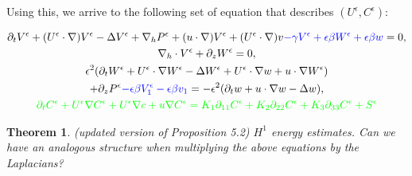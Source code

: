\documentclass[11pt]{article}
\newtheorem{theorem}{Theorem}
\begin{document}
Using this, we arrive to the following set of equation that describes $(U^\epsilon, C^\epsilon)$:

\begin{equation} \label{U_eps_C_eps}
  \begin{gathered}
    \partial_t V^\epsilon + (U^\epsilon \cdot \nabla) V^\epsilon - \Delta V^\epsilon + \nabla_h P^\epsilon + (u \cdot \nabla) V^\epsilon + (U^\epsilon \cdot \nabla) v \textcolor{blue}{- \gamma V^\epsilon + \epsilon \beta W^\epsilon  + \epsilon \beta w} = 0, \\
    \nabla_h \cdot V^\epsilon + \partial_z W^\epsilon = 0, \\
    \epsilon^2 (\partial_t W^\epsilon + U^\epsilon \cdot \nabla W^\epsilon - \Delta W^\epsilon + U^\epsilon \cdot \nabla w + u \cdot \nabla W^\epsilon) \\
    + \partial_z P^\epsilon \textcolor{blue}{- \epsilon \beta V_1^\epsilon - \epsilon \beta v_1} = - \epsilon^2 (\partial_t w + u \cdot \nabla w - \Delta w), \\
     \textcolor{green}{\partial_t C^\epsilon + U^\epsilon \nabla C^\epsilon  + U^\epsilon \nabla c+ u \nabla C^\epsilon = K_1 \partial_{11} C^\epsilon + K_2 \partial_{22} C^\epsilon + K_3 \partial_{33} C^\epsilon + S^\epsilon}
  \end{gathered}
\end{equation}

\begin{theorem}
(updated version of Proposition 5.2) $H^1$ energy estimates. Can we have an analogous structure when multiplying the above equations by the Laplacians?
\end{theorem}
\end{document}
